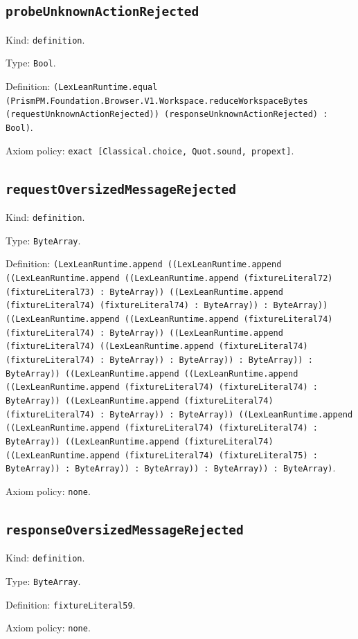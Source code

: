 \documentclass[11pt]{article}
\begin{document}
\subsection*{\texttt{probeUnknownActionRejected}}
\noindent Kind: \texttt{definition}.\par
\noindent Type: \texttt{Bool}.\par
\noindent Definition: \texttt{(LexLeanRuntime.equal (PrismPM.Foundation.Browser.V1.Workspace.reduceWorkspaceBytes (requestUnknownActionRejected)) (responseUnknownActionRejected) : Bool)}.\par
\noindent Axiom policy: \texttt{exact [Classical.choice, Quot.sound, propext]}.\par
\subsection*{\texttt{requestOversizedMessageRejected}}
\noindent Kind: \texttt{definition}.\par
\noindent Type: \texttt{ByteArray}.\par
\noindent Definition: \texttt{(LexLeanRuntime.append ((LexLeanRuntime.append ((LexLeanRuntime.append ((LexLeanRuntime.append (fixtureLiteral72) (fixtureLiteral73) : ByteArray)) ((LexLeanRuntime.append (fixtureLiteral74) (fixtureLiteral74) : ByteArray)) : ByteArray)) ((LexLeanRuntime.append ((LexLeanRuntime.append (fixtureLiteral74) (fixtureLiteral74) : ByteArray)) ((LexLeanRuntime.append (fixtureLiteral74) ((LexLeanRuntime.append (fixtureLiteral74) (fixtureLiteral74) : ByteArray)) : ByteArray)) : ByteArray)) : ByteArray)) ((LexLeanRuntime.append ((LexLeanRuntime.append ((LexLeanRuntime.append (fixtureLiteral74) (fixtureLiteral74) : ByteArray)) ((LexLeanRuntime.append (fixtureLiteral74) (fixtureLiteral74) : ByteArray)) : ByteArray)) ((LexLeanRuntime.append ((LexLeanRuntime.append (fixtureLiteral74) (fixtureLiteral74) : ByteArray)) ((LexLeanRuntime.append (fixtureLiteral74) ((LexLeanRuntime.append (fixtureLiteral74) (fixtureLiteral75) : ByteArray)) : ByteArray)) : ByteArray)) : ByteArray)) : ByteArray)}.\par
\noindent Axiom policy: \texttt{none}.\par
\subsection*{\texttt{responseOversizedMessageRejected}}
\noindent Kind: \texttt{definition}.\par
\noindent Type: \texttt{ByteArray}.\par
\noindent Definition: \texttt{fixtureLiteral59}.\par
\noindent Axiom policy: \texttt{none}.\par
\end{document}
